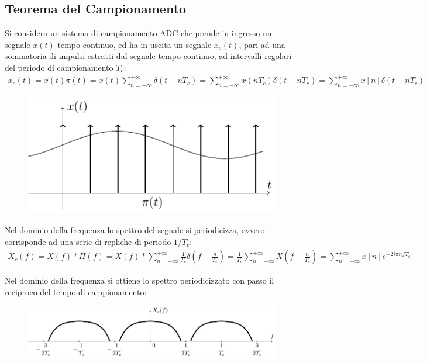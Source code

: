\documentclass{article}
\numberwithin{equation}{subsection}
\begin{document}
\subsection{Teorema del Campionamento}
\label{sec:teorema-campionamento}

Si considera un sistema di campionamento ADC che prende in ingresso un segnale $x(t)$ tempo continuo, ed ha in uscita un segnale $x_c(t)$, pari ad una 
sommatoria di impulsi estratti dal segnale tempo continuo, ad intervalli regolari del periodo di campionamento $T_c$:
\begin{gather*}
    x_c(t)=x(t)\pi(t)=x(t)\displaystyle\sum_{n=-\infty}^{+\infty}\delta(t-nT_c)=\sum_{n=-\infty}^{+\infty}x(nT_c)\delta(t-nT_c)=\sum_{n=-\infty}^{+\infty}x[n]\delta(t-nT_c)
\end{gather*}
\begin{figure}[H]%
    \centering
    \includegraphics{segnale-campionato.pdf}%
\end{figure}
Nel dominio della frequenza lo spettro del segnale si periodicizza, ovvero corrisponde ad una serie di repliche di periodo $1/T_c$:
\begin{gather*}
    X_c(f)=X(f)*\Pi(f)=\displaystyle X(f)*\sum_{n=-\infty}^{+\infty}\frac{1}{T_c}\delta\left(f-\frac{n}{T_c}\right)=\frac{1}{T_c}\sum_{n=-\infty}^{+\infty}X\left(f-\frac{n}{T_c}\right)=\sum_{n=-\infty}^{+\infty}x[n]e^{-2i\pi nfT_c}
\end{gather*}

Nel dominio della frequenza si ottiene lo spettro periodicizzato con passo il reciproco del tempo di campionamento: 
\begin{figure}[H]%
    \centering
    \includegraphics{segnale-campionato-frequenza.pdf}%
\end{figure}
\end{document}
